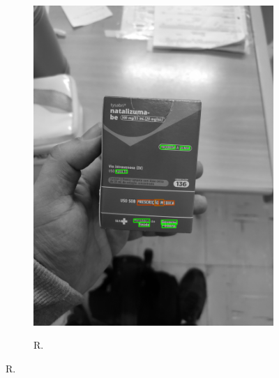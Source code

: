 \begin{figure}[htb]
\begin{subfigure}[t]{0.21\textwidth}
        \includegraphics[width=\linewidth]{../pictures/tysabri_gray_boxes.jpg}
    \end{subfigure}
    \hfill
    \begin{subfigure}[t]{0.21\textwidth}
        \centering
        \caption{R.}
        \label{fig:foto:versoes:1:R:boxes}

\end{subfigure}
\end{figure}
